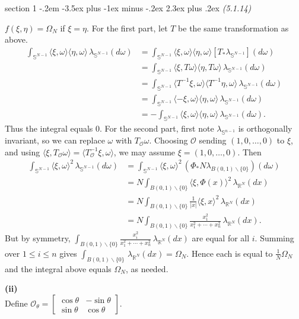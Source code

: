 \documentclass[12pt]{article}
\makeatletter
\theoremstyle{norm}
\newcommand{\bS}[0]{\mathbb{S}}
\newcommand{\sO}[0]{\mathcal{O}}
\newcommand{\R}[0]{\mathbb{R}}
\newcommand{\rc}[1]{\frac{1}{#1}}
\newcommand{\la}[0]{\lambda}
\newcommand{\te}[0]{\theta}
\newcommand{\om}[0]{\omega}
\newcommand{\Om}[0]{\Omega}
\newcommand{\pa}[1]{\left( {#1} \right)}
\newcommand{\an}[1]{\langle {#1}\rangle}
\newcommand{\subprob}[1]{\noindent\textbf{#1}\\}
\newcommand{\bs}[0]{\backslash}
\newcommand{\smatt}[4]{
\left[
\begin{smallmatrix}
{#1}&{#2}\\
{#3}&{#4}
\end{smallmatrix}
\right]}
\newenvironment{problem}{\@startsection
       {section}
       {1}
       {-.2em}
       {-3.5ex plus -1ex minus -.2ex}
       {2.3ex plus .2ex}
       {\pagebreak[3]%
       \large\bf\noindent{Problem }
       }
       }
       {%
       }
\makeatother
\begin{document}
\begin{problem}{\it (5.1.14)}
\begin{enumerate}
$f(\xi,\eta)=\Om_N$ if $\xi=\eta$. For the first part, let $T$ be the same transformation as above.
\begin{align*}
\int_{\bS^{N-1}} \an{\xi, \om}\an{\eta, \om} \,\la_{\bS^{N-1}}(d\om)
&=\int_{\bS^{N-1}} \an{\xi, \om}\an{\eta, \om} [T_* \la_{\bS^{N-1}}](d\om)\\
&=\int_{\bS^{N-1}}\an{\xi, T\om}\an{\eta, T\om} \,\la_{\bS^{N-1}}(d\om)\\
&=\int_{\bS^{N-1}}\an{T^{-1}\xi, \om}\an{T^{-1}\eta, \om} \,\la_{\bS^{N-1}}(d\om)\\
&=\int_{\bS^{N-1}}\an{-\xi, \om}\an{\eta, \om} \,\la_{\bS^{N-1}}(d\om)\\
&=-\int_{\bS^{N-1}} \an{\xi, \om}\an{\eta, \om} \,\la_{\bS^{N-1}}(d\om).
\end{align*}
Thus the integral equals 0. 
For the second part, first note $\la_{\bS^{n-1}}$ is orthogonally invariant, so we can replace $\om$ with $T_{\sO}\om$. Choosing $\sO$ sending $(1,0,\ldots, 0)$ to $\xi$, and using $\an{\xi, T_{\sO}\om}=\an{T_{\sO}^{-1}\xi,\om}$, we may assume $\xi=(1,0,\ldots, 0)$.  Then
\begin{align*}
\int_{\bS^{N-1}} \an{\xi,\om}^2 \,\la_{\bS^{N-1}}(d\om)
&=\int_{\bS^{N-1}} \an{\xi,\om}^2 \,(\Phi_* N\la_{B(0,1)\bs\{0\}})(d\om)\\
&=N\int_{B(0,1)\bs \{0\}} \an{\xi, \Phi(x)}^2 \,\la_{\R^N}(dx)\\
&=N\int_{B(0,1)\bs \{0\}} \rc{|x|}\an{\xi, x}^2 \,\la_{\R^N}(dx)\\
&=N\int_{B(0,1)\bs\{0\}}\frac{x_1^2}{x_1^2+\cdots +x_n^2}\,\la_{\R^N}(dx).
\end{align*}
But by symmetry, $\int_{B(0,1)\bs\{0\}}\frac{x_i^2}{x_1^2+\cdots +x_n^2}\,\la_{\R^N}(dx)$ are equal for all $i$. Summing over $1\le i\le n$ gives $\int_{B(0,1)\bs\{0\}}\,\la_{\R^N}(dx)=\Om_N$. Hence each is equal to $\rc{N}\Om_N$ and the integral above equals $\Om_N$, as needed.
\end{enumerate}
\subprob{(ii)}
Define $\sO_{\theta}=\smatt{\cos\theta}{-\sin\theta}{\sin\theta}{\cos\theta}$. 

\end{problem}
\end{document}
